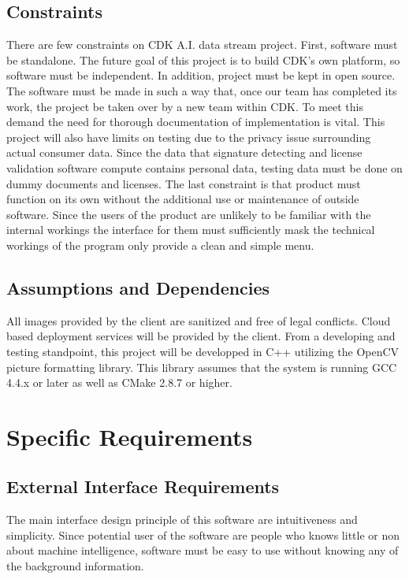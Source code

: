 \documentclass[onecolumn, draftclsnofoot,10pt, compsoc]{IEEEtran}
\begin{document}
\subsection{Constraints}
There are few constraints on CDK A.I. data stream project. First, software must be standalone. The future goal of this project is to build CDK’s own platform, so software must be independent. In addition, project must be kept in open source. The software must be made in such a way that, once our team has completed its work, the project be taken over by a new team within CDK. To meet this demand the need for thorough documentation of implementation is vital. This project will also have limits on testing due to the privacy issue surrounding actual consumer data. Since the data that signature detecting and license validation software compute contains personal data, testing data must be done on dummy documents and licenses. The last constraint is that product must function on its own without the additional use or maintenance of outside software. Since the users of the product are unlikely to be familiar with the internal workings the interface for them must sufficiently mask the technical workings of the program only provide a clean and simple menu.

\subsection{Assumptions and Dependencies}

All images provided by the client are sanitized and free of legal conflicts. Cloud based deployment services will be provided by the client. From a developing and testing standpoint, this project will be developped in C++ utilizing the OpenCV picture formatting library. This library assumes that the system is running GCC 4.4.x or later as well as CMake 2.8.7 or higher. 



\section{Specific Requirements}

\subsection{External Interface Requirements}
The main interface design principle of this software are intuitiveness and simplicity. Since potential user of the software are people who knows little or non about machine intelligence, software must be easy to use without knowing any of the background information.
\end{document}
